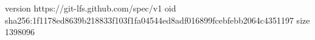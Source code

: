 version https://git-lfs.github.com/spec/v1
oid sha256:1f1178ed8639b218833f103f1fa04544ed8adf016899fcebfebb2064c4351197
size 1398096
